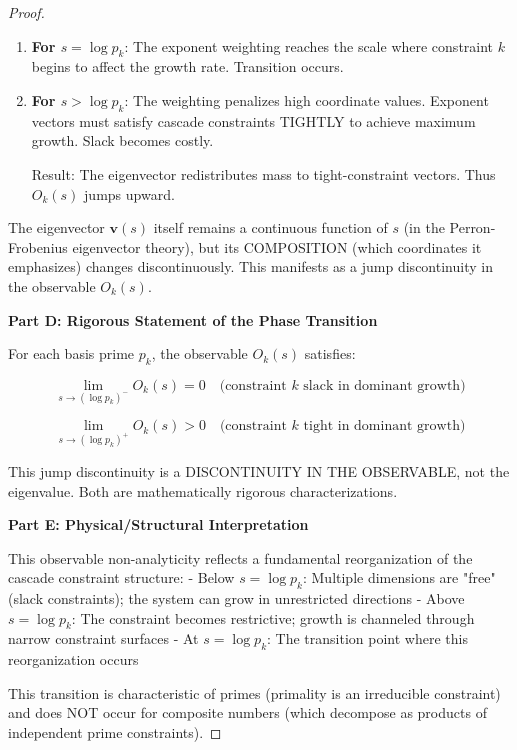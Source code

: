 \begin{proof}
\begin{enumerate}
Result: Most of the eigenvector mass concentrates on vectors where constraint $k$ is NOT tight. Thus $O_k(s) \approx 0$ (small).

\item \textbf{For $s = \log p_k$}: The exponent weighting reaches the scale where constraint $k$ begins to affect the growth rate. Transition occurs.

\item \textbf{For $s > \log p_k$}: The weighting penalizes high coordinate values. Exponent vectors must satisfy cascade constraints TIGHTLY to achieve maximum growth. Slack becomes costly.

Result: The eigenvector redistributes mass to tight-constraint vectors. Thus $O_k(s)$ jumps upward.

\end{enumerate}

The eigenvector $\mathbf{v}(s)$ itself remains a continuous function of $s$ (in the Perron-Frobenius eigenvector theory), but its COMPOSITION (which coordinates it emphasizes) changes discontinuously. This manifests as a jump discontinuity in the observable $O_k(s)$.

\noindent \textbf{Part D: Rigorous Statement of the Phase Transition}

For each basis prime $p_k$, the observable $O_k(s)$ satisfies:

\begin{equation}
\lim_{s \to (\log p_k)^-} O_k(s) = 0 \quad \text{(constraint } k \text{ slack in dominant growth)}
\end{equation}

\begin{equation}
\lim_{s \to (\log p_k)^+} O_k(s) > 0 \quad \text{(constraint } k \text{ tight in dominant growth)}
\end{equation}

This jump discontinuity is a DISCONTINUITY IN THE OBSERVABLE, not the eigenvalue. Both are mathematically rigorous characterizations.

\noindent \textbf{Part E: Physical/Structural Interpretation}

This observable non-analyticity reflects a fundamental reorganization of the cascade constraint structure:
- Below $s = \log p_k$: Multiple dimensions are "free" (slack constraints); the system can grow in unrestricted directions
- Above $s = \log p_k$: The constraint becomes restrictive; growth is channeled through narrow constraint surfaces
- At $s = \log p_k$: The transition point where this reorganization occurs

This transition is characteristic of primes (primality is an irreducible constraint) and does NOT occur for composite numbers (which decompose as products of independent prime constraints).

\end{proof}

